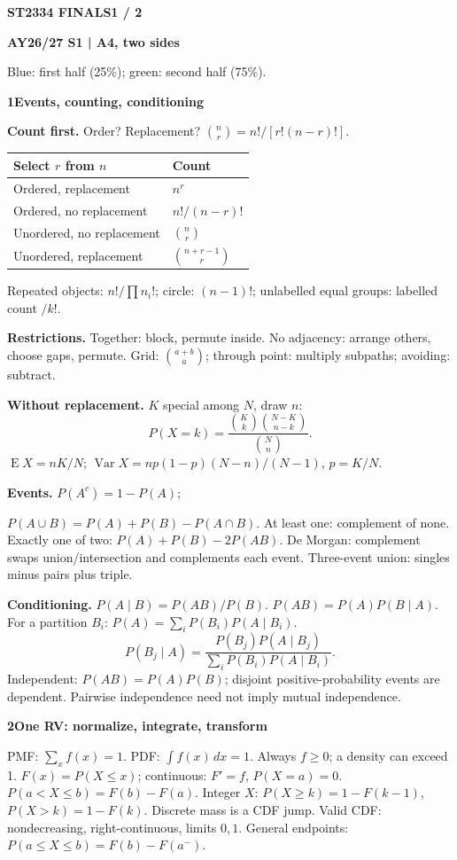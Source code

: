 \documentclass[a4paper,landscape]{article}
\newcommand{\head}[2][late]{\par\vspace{3pt}\noindent\colorbox{#1}{\parbox{\dimexpr\linewidth-6pt}{\color{white}\bfseries #2}}\par\vspace{1pt}}
\newcommand{\cue}[1]{\par\textbf{#1}\enspace}
\newcommand{\E}{\operatorname{E}}
\newcommand{\V}{\operatorname{Var}}
\newcommand{\tblhead}[1]{\textbf{#1}}
\begin{document}
\fontsize{7.4}{8.1}\selectfont
\sffamily\raggedright
\setlength{\abovedisplayskip}{2pt}
\setlength{\belowdisplayskip}{2pt}
\setlength{\abovedisplayshortskip}{1pt}
\setlength{\belowdisplayshortskip}{1pt}
\begin{multicols*}{4}
\head[early]{ST2334 FINALS\hfill 1 / 2}
\textbf{AY26/27 S1 | A4, two sides}\par
Blue: first half (25\%); green: second half (75\%).
\head[early]{1\quad Events, counting, conditioning}
\cue{Count first.} Order? Replacement? \({n\choose r}=n!/[r!(n-r)!]\).
\begin{tabular}{@{}L{.51\linewidth}L{.44\linewidth}@{}}
\tblhead{Select \(r\) from \(n\)} & \tblhead{Count}\\\hline
Ordered, replacement & \(n^r\)\\
Ordered, no replacement & \(n!/(n-r)!\)\\
Unordered, no replacement & \({n\choose r}\)\\
Unordered, replacement & \({n+r-1\choose r}\)
\end{tabular}
Repeated objects: \(n!/\prod n_i!\); circle: \((n-1)!\); unlabelled equal groups: labelled count \(/k!\).
\cue{Restrictions.} Together: block, permute inside. No adjacency: arrange others, choose gaps, permute. Grid: \({a+b\choose a}\); through point: multiply subpaths; avoiding: subtract.
\cue{Without replacement.} \(K\) special among \(N\), draw \(n\):
\[P(X=k)=\frac{{K\choose k}{N-K\choose n-k}}{{N\choose n}}.\]
\(\E X=nK/N\); \(\V X=np(1-p)(N-n)/(N-1)\), \(p=K/N\).
\cue{Events.} \(P(A^c)=1-P(A)\);\par
\(P(A\cup B)=P(A)+P(B)-P(A\cap B)\).
At least one: complement of none. Exactly one of two: \(P(A)+P(B)-2P(AB)\).
De Morgan: complement swaps union/intersection and complements each event. Three-event union: singles minus pairs plus triple.
\cue{Conditioning.} \(P(A\mid B)=P(AB)/P(B)\).
\(P(AB)=P(A)P(B\mid A)\). For a partition \(B_i\):
\(P(A)=\sum_iP(B_i)P(A\mid B_i)\).
\[
 P(B_j\mid A)=\frac{P(B_j)P(A\mid B_j)}{\sum_iP(B_i)P(A\mid B_i)}.\]
Independent: \(P(AB)=P(A)P(B)\); disjoint positive-probability events are dependent. Pairwise independence need not imply mutual independence.
\head[early]{2\quad One RV: normalize, integrate, transform}
PMF: \(\sum_x f(x)=1\). PDF: \(\int f(x)\,dx=1\). Always \(f\ge0\); a density can exceed 1.
\(F(x)=P(X\le x)\); continuous: \(F'=f\), \(P(X=a)=0\).
\(P(a<X\le b)=F(b)-F(a)\).
Integer \(X\): \(P(X\ge k)=1-F(k-1)\), \(P(X>k)=1-F(k)\). Discrete mass is a CDF jump.
Valid CDF: nondecreasing, right-continuous, limits \(0,1\). General endpoints: \(P(a\le X\le b)=F(b)-F(a^-)\).

\end{multicols*}
\end{document}
